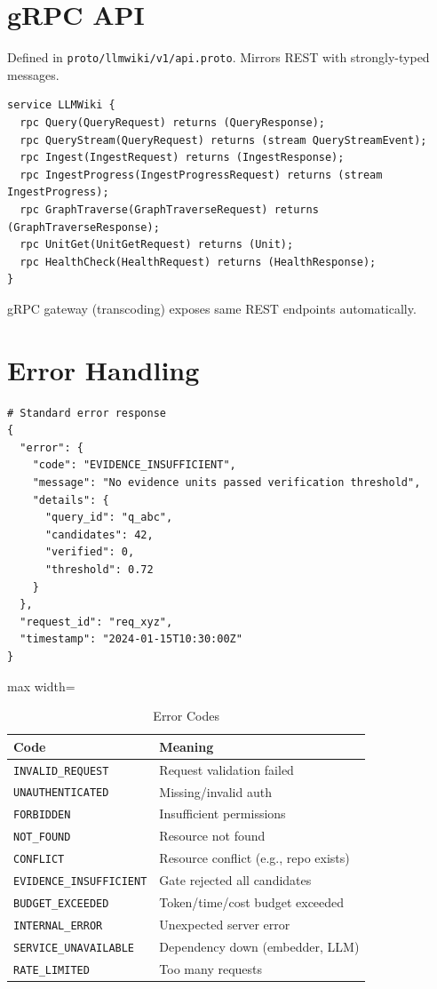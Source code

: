 \section{gRPC API}
\label{sec:api:grpc}

Defined in \texttt{proto/llmwiki/v1/api.proto}. Mirrors REST with strongly-typed messages.

\begin{verbatim}
service LLMWiki {
  rpc Query(QueryRequest) returns (QueryResponse);
  rpc QueryStream(QueryRequest) returns (stream QueryStreamEvent);
  rpc Ingest(IngestRequest) returns (IngestResponse);
  rpc IngestProgress(IngestProgressRequest) returns (stream IngestProgress);
  rpc GraphTraverse(GraphTraverseRequest) returns (GraphTraverseResponse);
  rpc UnitGet(UnitGetRequest) returns (Unit);
  rpc HealthCheck(HealthRequest) returns (HealthResponse);
}
\end{verbatim}

gRPC gateway (transcoding) exposes same REST endpoints automatically.

\section{Error Handling}
\label{sec:api:errors}

\begin{verbatim}
# Standard error response
{
  "error": {
    "code": "EVIDENCE_INSUFFICIENT",
    "message": "No evidence units passed verification threshold",
    "details": {
      "query_id": "q_abc",
      "candidates": 42,
      "verified": 0,
      "threshold": 0.72
    }
  },
  "request_id": "req_xyz",
  "timestamp": "2024-01-15T10:30:00Z"
}
\end{verbatim}

\begin{table}[htbp]
\centering
\caption{Error Codes}
\label{tab:api:errors}
\begin{adjustbox}{max width=\textwidth}
\begin{tabular}{ll}
\toprule
\textbf{Code} & \textbf{Meaning} \\
\midrule
\texttt{INVALID\_REQUEST} & Request validation failed \\
\texttt{UNAUTHENTICATED} & Missing/invalid auth \\
\texttt{FORBIDDEN} & Insufficient permissions \\
\texttt{NOT\_FOUND} & Resource not found \\
\texttt{CONFLICT} & Resource conflict (e.g., repo exists) \\
\texttt{EVIDENCE\_INSUFFICIENT} & Gate rejected all candidates \\
\texttt{BUDGET\_EXCEEDED} & Token/time/cost budget exceeded \\
\texttt{INTERNAL\_ERROR} & Unexpected server error \\
\texttt{SERVICE\_UNAVAILABLE} & Dependency down (embedder, LLM) \\
\texttt{RATE\_LIMITED} & Too many requests \\
\bottomrule
\end{tabular}
\end{adjustbox}
\end{table}

